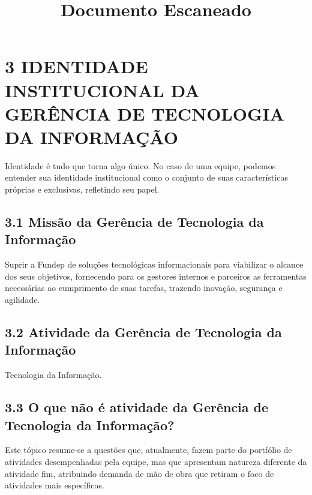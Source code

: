 \documentclass{article}
\title{Documento Escaneado}
\author{}
\date{}
\begin{document}
\maketitle

\section*{3 IDENTIDADE INSTITUCIONAL DA GERÊNCIA DE TECNOLOGIA DA INFORMAÇÃO}

Identidade é tudo que torna algo único. No caso de uma equipe, podemos entender sua identidade institucional como o conjunto de suas características próprias e exclusivas, refletindo seu papel.

\subsection*{3.1 Missão da Gerência de Tecnologia da Informação}

Suprir a Fundep de soluções tecnológicas informacionais para viabilizar o alcance dos seus objetivos, fornecendo para os gestores internos e parceiros as ferramentas necessárias ao cumprimento de suas tarefas, trazendo inovação, segurança e agilidade.

\subsection*{3.2 Atividade da Gerência de Tecnologia da Informação}

Tecnologia da Informação.

\subsection*{3.3 O que não é atividade da Gerência de Tecnologia da Informação?}

Este tópico resume-se a questões que, atualmente, fazem parte do portfólio de atividades desempenhadas pela equipe, mas que apresentam natureza diferente da atividade fim, atribuindo demanda de mão de obra que retiram o foco de atividades mais específicas.
\end{document}
